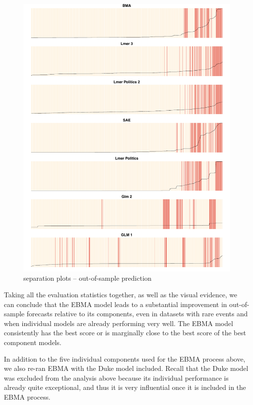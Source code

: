 \documentclass[pdftex,12pt,fullpage,oneside]{amsart}
\begin{document}
\begin{figure}[ht!]
\caption{separation plots -- out-of-sample prediction}
\label{OutSam1sep}
\includegraphics[width=6.2 in]{Plots_Outsample_NoICEWS}
\end{figure}

Taking all the evaluation statistics together, as well as the visual
evidence, we can conclude that the EBMA model leads to a substantial
improvement in out-of-sample forecasts relative to its components, even
in datasets with rare events and when individual models are already
performing very well. The EBMA model consistently has the best score
or is marginally close to the best score of the best component models.

In addition to the five individual components used for the EBMA process
above, we also re-ran EBMA with the Duke model included. Recall that
the Duke model was excluded from the analysis above because its
individual performance is already quite exceptional, and thus it is
very influential once it is included in the EBMA process.
\end{document}
